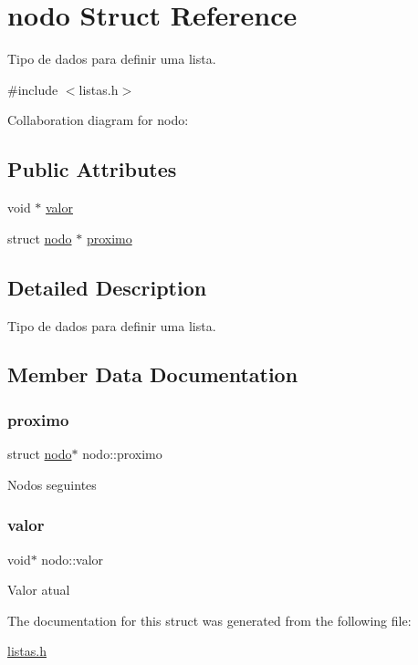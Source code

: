 \hypertarget{structnodo}{}\section{nodo Struct Reference}
\label{structnodo}


Tipo de dados para definir uma lista.  




{\ttfamily \#include $<$listas.\+h$>$}



Collaboration diagram for nodo\+:
\subsection*{Public Attributes}
\begin{DoxyCompactItemize}
\item 
void $\ast$ \hyperlink{structnodo_ab63adcdb83ea1fdcf4fa10f3cafc4a6a}{valor}
\item 
struct \hyperlink{structnodo}{nodo} $\ast$ \hyperlink{structnodo_aaaabdcb6641ddcdac8990402242b154a}{proximo}
\end{DoxyCompactItemize}


\subsection{Detailed Description}
Tipo de dados para definir uma lista. 

\subsection{Member Data Documentation}
\mbox{\label{structnodo_aaaabdcb6641ddcdac8990402242b154a}} 
\subsubsection{\texorpdfstring{proximo}{proximo}}
{\footnotesize\ttfamily struct \hyperlink{structnodo}{nodo}$\ast$ nodo\+::proximo}

Nodos seguintes \mbox{\label{structnodo_ab63adcdb83ea1fdcf4fa10f3cafc4a6a}} 
\subsubsection{\texorpdfstring{valor}{valor}}
{\footnotesize\ttfamily void$\ast$ nodo\+::valor}

Valor atual 

The documentation for this struct was generated from the following file\+:\begin{DoxyCompactItemize}
\item 
\hyperlink{listas_8h}{listas.\+h}\end{DoxyCompactItemize}
